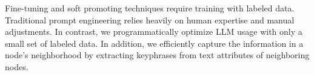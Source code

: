 Fine-tuning and soft promoting techniques require training with labeled data. Traditional prompt engineering relies heavily on human expertise and manual adjustments. In contrast, we programmatically optimize LLM usage with only a small set of labeled data. In addition, we efficiently capture the information in a node's neighborhood by extracting keyphrases from text attributes of neighboring nodes. 







%